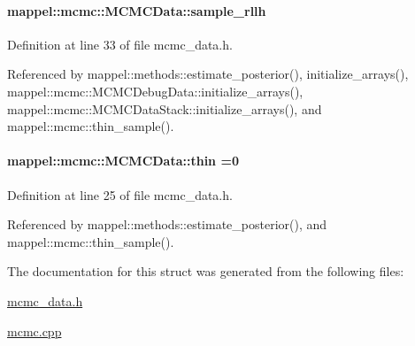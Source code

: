 \paragraph[{\texorpdfstring{sample\+\_\+rllh}{sample_rllh}}]{ mappel\+::mcmc\+::\+M\+C\+M\+C\+Data\+::sample\+\_\+rllh}\hypertarget{structmappel_1_1mcmc_1_1MCMCData_a253ec198d03bf713be355ca38371558d}{}\label{structmappel_1_1mcmc_1_1MCMCData_a253ec198d03bf713be355ca38371558d}


Definition at line 33 of file mcmc\+\_\+data.\+h.



Referenced by mappel\+::methods\+::estimate\+\_\+posterior(), initialize\+\_\+arrays(), mappel\+::mcmc\+::\+M\+C\+M\+C\+Debug\+Data\+::initialize\+\_\+arrays(), mappel\+::mcmc\+::\+M\+C\+M\+C\+Data\+Stack\+::initialize\+\_\+arrays(), and mappel\+::mcmc\+::thin\+\_\+sample().

\paragraph[{\texorpdfstring{thin}{thin}}]{ mappel\+::mcmc\+::\+M\+C\+M\+C\+Data\+::thin =0}\hypertarget{structmappel_1_1mcmc_1_1MCMCData_a07822492904641403d2ede5eac1f1279}{}\label{structmappel_1_1mcmc_1_1MCMCData_a07822492904641403d2ede5eac1f1279}


Definition at line 25 of file mcmc\+\_\+data.\+h.



Referenced by mappel\+::methods\+::estimate\+\_\+posterior(), and mappel\+::mcmc\+::thin\+\_\+sample().



The documentation for this struct was generated from the following files\+:\begin{DoxyCompactItemize}
\item 
\hyperlink{mcmc__data_8h}{mcmc\+\_\+data.\+h}\item 
\hyperlink{mcmc_8cpp}{mcmc.\+cpp}\end{DoxyCompactItemize}
